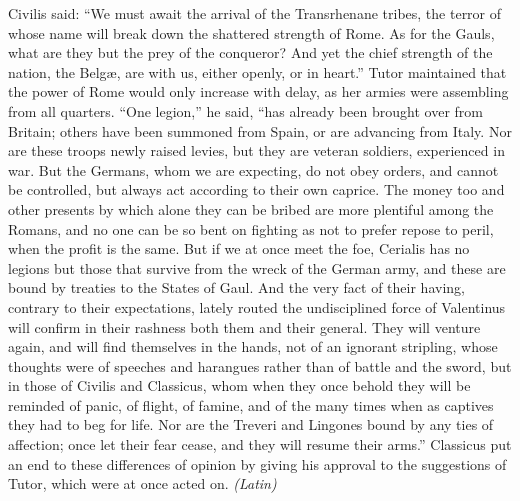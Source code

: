 
Civilis said: ``We must await the arrival of the Transrhenane tribes, the terror of whose name will break down the shattered strength of Rome. As for the Gauls, what are they but the prey of the conqueror? And yet the chief strength of the nation, the Belgæ, are with us, either openly, or in heart.'' Tutor maintained that the power of Rome would only increase with delay, as her armies were assembling from all quarters. ``One legion,'' he said, ``has already been brought over from Britain; others have been summoned from Spain, or are advancing from Italy. Nor are these troops newly raised levies, but they are veteran soldiers, experienced in war. But the Germans, whom we are expecting, do not obey orders, and cannot be controlled, but always act according to their own caprice. The money too and other presents by which alone they can be bribed are more plentiful among the Romans, and no one can be so bent on fighting as not to prefer repose to peril, when the profit is the same. But if we at once meet the foe, Cerialis has no legions but those that survive from the wreck of the German army, and these are bound by treaties to the States of Gaul. And the very fact of their having, contrary to their expectations, lately routed the undisciplined force of Valentinus will confirm in their rashness both them and their general. They will venture again, and will find themselves in the hands, not of an ignorant stripling, whose thoughts were of speeches and harangues rather than of battle and the sword, but in those of Civilis and Classicus, whom when they once behold they will be reminded of panic, of flight, of famine, and of the many times when as captives they had to beg for life. Nor are the Treveri and Lingones bound by any ties of affection; once let their fear cease, and they will resume their arms.'' Classicus put an end to these differences of opinion by giving his approval to the suggestions of Tutor, which were at once acted on. \emph{(Latin)}


